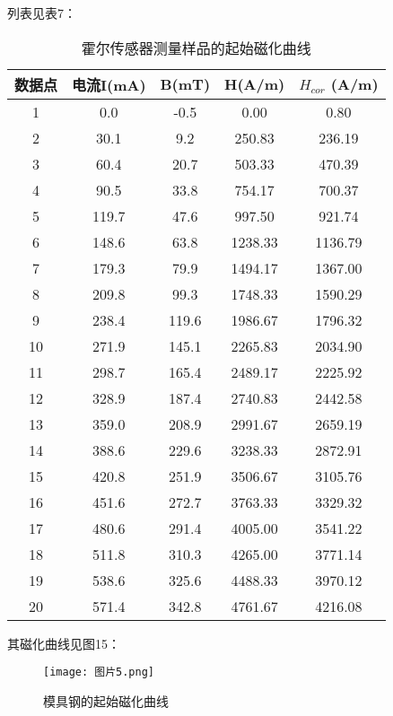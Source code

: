 \documentclass[11pt]{article}
\begin{document}
列表见表7：
\begin{table}[H]
    \centering
    \begin{tabular}{ccccc}
        \toprule
        数据点 & 电流I(mA) & B(mT) & H(A/m) & $H_{cor}$ (A/m)\\ \midrule
        1 & 0.0 & -0.5 & 0.00  & 0.80  \\ 
        2 & 30.1 & 9.2 & 250.83  & 236.19  \\ 
        3 & 60.4 & 20.7 & 503.33  & 470.39  \\ 
        4 & 90.5 & 33.8 & 754.17  & 700.37  \\ 
        5 & 119.7 & 47.6 & 997.50  & 921.74  \\ 
        6 & 148.6 & 63.8 & 1238.33  & 1136.79  \\ 
        7 & 179.3 & 79.9 & 1494.17  & 1367.00  \\ 
        8 & 209.8 & 99.3 & 1748.33  & 1590.29  \\ 
        9 & 238.4 & 119.6 & 1986.67  & 1796.32  \\ 
        10 & 271.9 & 145.1 & 2265.83  & 2034.90  \\ 
        11 & 298.7 & 165.4 & 2489.17  & 2225.92  \\ 
        12 & 328.9 & 187.4 & 2740.83  & 2442.58  \\ 
        13 & 359.0  & 208.9 & 2991.67  & 2659.19  \\ 
        14 & 388.6 & 229.6 & 3238.33  & 2872.91  \\ 
        15 & 420.8 & 251.9 & 3506.67  & 3105.76  \\ 
        16 & 451.6 & 272.7 & 3763.33  & 3329.32  \\ 
        17 & 480.6 & 291.4 & 4005.00  & 3541.22  \\ 
        18 & 511.8 & 310.3 & 4265.00  & 3771.14  \\ 
        19 & 538.6 & 325.6 & 4488.33  & 3970.12  \\ 
        20 & 571.4 & 342.8 & 4761.67  & 4216.08 \\ 
        \bottomrule
    \end{tabular}
    \caption{霍尔传感器测量样品的起始磁化曲线}
\end{table}

其磁化曲线见图15：

\begin{figure}[H]
    \centering
    \texttt{[image: 图片5.png]}
    \caption{模具钢的起始磁化曲线}
\end{figure}
\end{document}
